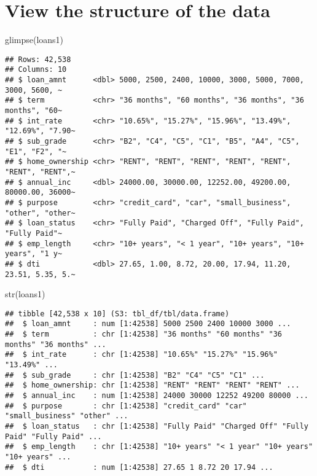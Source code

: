\documentclass[
]{article}
\newenvironment{Shaded}{\begin{snugshade}}{\end{snugshade}}
\newcommand{\FunctionTok}[1]{\textcolor[rgb]{0.00,0.00,0.00}{#1}}
\newcommand{\NormalTok}[1]{#1}
\begin{document}
\hypertarget{view-the-structure-of-the-data}{%
\section{View the structure of the
data}\label{view-the-structure-of-the-data}}

\begin{Shaded}
\begin{Highlighting}[]
\FunctionTok{glimpse}\NormalTok{(loans1)}
\end{Highlighting}
\end{Shaded}

\begin{verbatim}
## Rows: 42,538
## Columns: 10
## $ loan_amnt      <dbl> 5000, 2500, 2400, 10000, 3000, 5000, 7000, 3000, 5600, ~
## $ term           <chr> "36 months", "60 months", "36 months", "36 months", "60~
## $ int_rate       <chr> "10.65%", "15.27%", "15.96%", "13.49%", "12.69%", "7.90~
## $ sub_grade      <chr> "B2", "C4", "C5", "C1", "B5", "A4", "C5", "E1", "F2", "~
## $ home_ownership <chr> "RENT", "RENT", "RENT", "RENT", "RENT", "RENT", "RENT",~
## $ annual_inc     <dbl> 24000.00, 30000.00, 12252.00, 49200.00, 80000.00, 36000~
## $ purpose        <chr> "credit_card", "car", "small_business", "other", "other~
## $ loan_status    <chr> "Fully Paid", "Charged Off", "Fully Paid", "Fully Paid"~
## $ emp_length     <chr> "10+ years", "< 1 year", "10+ years", "10+ years", "1 y~
## $ dti            <dbl> 27.65, 1.00, 8.72, 20.00, 17.94, 11.20, 23.51, 5.35, 5.~
\end{verbatim}

\begin{Shaded}
\begin{Highlighting}[]
\FunctionTok{str}\NormalTok{(loans1)}
\end{Highlighting}
\end{Shaded}

\begin{verbatim}
## tibble [42,538 x 10] (S3: tbl_df/tbl/data.frame)
##  $ loan_amnt     : num [1:42538] 5000 2500 2400 10000 3000 ...
##  $ term          : chr [1:42538] "36 months" "60 months" "36 months" "36 months" ...
##  $ int_rate      : chr [1:42538] "10.65%" "15.27%" "15.96%" "13.49%" ...
##  $ sub_grade     : chr [1:42538] "B2" "C4" "C5" "C1" ...
##  $ home_ownership: chr [1:42538] "RENT" "RENT" "RENT" "RENT" ...
##  $ annual_inc    : num [1:42538] 24000 30000 12252 49200 80000 ...
##  $ purpose       : chr [1:42538] "credit_card" "car" "small_business" "other" ...
##  $ loan_status   : chr [1:42538] "Fully Paid" "Charged Off" "Fully Paid" "Fully Paid" ...
##  $ emp_length    : chr [1:42538] "10+ years" "< 1 year" "10+ years" "10+ years" ...
##  $ dti           : num [1:42538] 27.65 1 8.72 20 17.94 ...
\end{verbatim}
\end{document}
